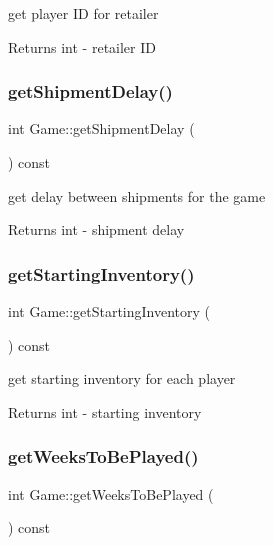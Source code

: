 get player ID for retailer \begin{DoxyReturn}{Returns}
int -\/ retailer ID 
\end{DoxyReturn}
\mbox{\label{classGame_ab25852cc4c2df47382d33cfe3c2b55d0}} 
\subsubsection{\texorpdfstring{get\+Shipment\+Delay()}{getShipmentDelay()}}
{\footnotesize\ttfamily int Game\+::get\+Shipment\+Delay (\begin{DoxyParamCaption}{ }\end{DoxyParamCaption}) const}

get delay between shipments for the game \begin{DoxyReturn}{Returns}
int -\/ shipment delay 
\end{DoxyReturn}
\mbox{\label{classGame_aab794be46d7e7d8832ca6b5430cd61e2}} 
\subsubsection{\texorpdfstring{get\+Starting\+Inventory()}{getStartingInventory()}}
{\footnotesize\ttfamily int Game\+::get\+Starting\+Inventory (\begin{DoxyParamCaption}{ }\end{DoxyParamCaption}) const}

get starting inventory for each player \begin{DoxyReturn}{Returns}
int -\/ starting inventory 
\end{DoxyReturn}
\mbox{\label{classGame_a3a9810e55fb1b4b5df6c887811c73885}} 
\subsubsection{\texorpdfstring{get\+Weeks\+To\+Be\+Played()}{getWeeksToBePlayed()}}
{\footnotesize\ttfamily int Game\+::get\+Weeks\+To\+Be\+Played (\begin{DoxyParamCaption}{ }\end{DoxyParamCaption}) const}

